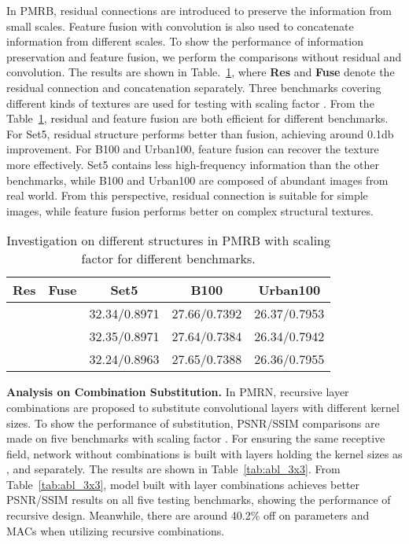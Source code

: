 \documentclass[journal]{IEEEtran}
\begin{document}
In PMRB, residual connections are introduced to preserve the information from small scales. Feature fusion with  convolution is also used to concatenate information from different scales. To show the performance of information preservation and feature fusion, we perform the comparisons without residual and  convolution. The results are shown in Table.~\ref{tab:abl_pmrb}, where \textbf{Res} and \textbf{Fuse} denote the residual connection and concatenation separately. Three benchmarks covering different kinds of textures are used for testing with scaling factor .
From the Table~\ref{tab:abl_pmrb}, residual and feature fusion are both efficient for different benchmarks. For Set5, residual structure performs better than fusion, achieving around 0.1db improvement. For B100 and Urban100, feature fusion can recover the texture more effectively. Set5 contains less high-frequency information than the other benchmarks, while B100 and Urban100 are composed of abundant images from real world. From this perspective, residual connection is suitable for simple images, while feature fusion performs better on complex structural textures.

\begin{table}
	\centering
	\caption{Investigation on different structures in PMRB with scaling factor  for different benchmarks.}
	\label{tab:abl_pmrb}
\begin{tabular}{|c|c|c|c|c|}
		\hline  
		\textbf{Res}& \textbf{Fuse}& \textbf{Set5}& \textbf{B100} &\textbf{Urban100} \\
		\hline
		\hline
		\cmark&\cmark& 32.34/0.8971& 27.66/0.7392& 26.37/0.7953\\ 
		\cmark&\xmark& 32.35/0.8971& 27.64/0.7384& 26.34/0.7942\\
		\xmark&\cmark& 32.24/0.8963& 27.65/0.7388& 26.36/0.7955\\
		\hline
	\end{tabular}
\end{table}

\textbf{Analysis on Combination Substitution.}
In PMRN, recursive layer combinations are proposed to substitute convolutional layers with different kernel sizes. To show the performance of substitution, PSNR/SSIM comparisons are made on five benchmarks with scaling factor . For ensuring the same receptive field, network without combinations is built with layers holding the kernel sizes as ,  and  separately. The results are shown in Table~\ref{tab:abl_3x3}.
From Table~\ref{tab:abl_3x3}, model built with layer combinations achieves better PSNR/SSIM results on all five testing benchmarks, showing the performance of recursive design. Meanwhile, there are around 40.2\% off on parameters and MACs when utilizing recursive combinations. 
\end{document}

